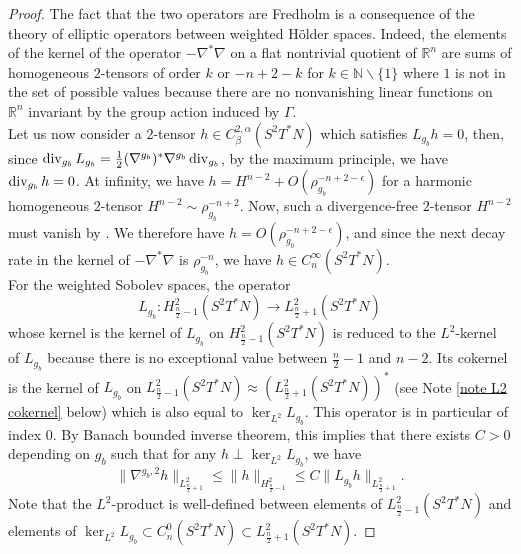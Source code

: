 \documentclass[a4paper,11pt,reqno]{amsart}
\def\div{\mathop{\rm div}\nolimits}
\def\div{\mathop{\rm div}\nolimits}
\numberwithin{equation}{section}
\begin{document}
	\begin{proof}
		The fact that the two operators are Fredholm is a consequence of the theory of elliptic operators between weighted Hölder spaces. Indeed, the elements of the kernel of the operator $-\nabla^*\nabla$ on a flat nontrivial quotient of $\mathbb{R}^n$ are sums of homogeneous $2$-tensors of order $k$ or $-n+2-k$ for $k\in \mathbb{N}\backslash\{1\}$ where $1$ is not in the set of possible values because there are no nonvanishing linear functions on $\mathbb{R}^n$ invariant by the group action induced by $\Gamma$.\\
		
		Let us now consider a $2$-tensor $h\in C^{2,\alpha}_{\beta}(S^2T^*N)$ which satisfies $L_{g_b}h = 0$, then, since $\div_{g_b}L_{g_b}=\frac{1}{2}(\nabla^{g_b})^{\ast}\nabla^{g_b}\div_{g_b}$, by the maximum principle, we have $\div_{g_b}h=0$.  At infinity, we have $h = H^{n-2} + O(\rho_{g_b}^{-n+2-\epsilon})$ for a harmonic homogeneous $2$-tensor $H^{n-2}\sim \rho_{g_b}^{-n+2}$. Now, such a divergence-free $2$-tensor $H^{n-2}$ must vanish by \cite[Lemma 4.1]{ozu2}. We therefore have $ h =  O(\rho_{g_b}^{-n+2-\epsilon}) $, and since the next decay rate in the kernel of $-\nabla^*\nabla$ is $\rho_{g_b}^{-n}$, we have $h\in C^{\infty}_{n}(S^2T^*N)$.
		\\
		
		For the weighted Sobolev spaces, the operator $$L_{g_b}:H^2_{\frac{n}{2}-1}(S^2T^*N)\rightarrow L^2_{\frac{n}{2}+1}(S^2T^*N)$$ whose kernel is the kernel of $L_{g_b}$ on $H^2_{\frac{n}{2}-1}(S^2T^*N)$ is reduced to the $L^2$-kernel of $L_{g_b}$ because there is no exceptional value between $\frac{n}{2}-1$ and $n-2$. Its cokernel is the kernel of $L_{g_b}$ on $L^2_{\frac{n}{2}-1}(S^2T^*N)\approx \left(L^2_{\frac{n}{2}+1}(S^2T^*N)\right)^*$ (see Note \ref{note L2 cokernel} below) which is also equal to $\ker_{L^2}L_{g_b}$. This operator is in particular of index $0$. By Banach bounded inverse theorem, this implies that there exists $C>0$ depending on $g_b$ such that for any $h\perp\ker_{L^2}L_{g_b}$, we have
		$$\|\nabla^{g_b,2}h\|_{L^2_{\frac{n}{2}+1}}\leq \|h\|_{H^2_{\frac{n}{2}-1}}\leq C \|L_{g_b} h \|_{L^2_{\frac{n}{2}+1}}.$$
		Note that the $L^2$-product is well-defined between elements of $L^2_{\frac{n}{2}-1}(S^2T^*N)$ and elements of $\ker_{L^2}L_{g_b} \subset C^0_n(S^2T^*N)\subset L^2_{\frac{n}{2}+1}(S^2T^*N)$.
	\end{proof}
	
\end{document}
